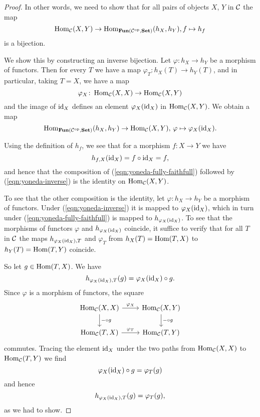 \begin{proof}
In other words, we need to show that for all pairs of objects $X$, $Y$ in ${\mathcal{C}}$ the map
\begin{equation}\label{eqn:yoneda-fully-faithfull}
	\operatorname{Hom}_{\mathcal{C}}(X,Y) \to \operatorname{Hom}_{\mathbf{Fun}({\mathcal{C}}^{\mathrm{op}},\mathbf{Set})}(h_X,h_Y), f \mapsto h_f
\end{equation}
is a bijection. 

We show this by constructing an inverse bijection. Let $\varphi\colon h_X\to h_Y$ be a morphism of functors. Then for every $T$ we have a map $\varphi_T\colon h_X(T) \to h_Y(T)$, and in particular, taking $T=X$, we have a map
\[
	\varphi_X \colon \operatorname{Hom}_{\mathcal{C}}(X,X) \to \operatorname{Hom}_{\mathcal{C}}(X,Y)
\]
and the image of ${\rm id}_X$ defines an element $\varphi_X({\rm id}_X)$ in $\operatorname{Hom}_{\mathcal{C}}(X,Y)$. We obtain a map
\begin{equation}\label{eqn:yoneda-inverse}
	\operatorname{Hom}_{\mathbf{Fun}({\mathcal{C}}^{\mathrm{op}},\mathbf{Set})}(h_X,h_Y) \to \operatorname{Hom}_{\mathcal{C}}(X,Y),\, \varphi \mapsto \varphi_X({\rm id}_X).
\end{equation}

Using the definition of $h_f$, we see that for a morphism $f\colon X\to Y$ we have
\[
	h_{f,X}({\rm id}_X) = f \circ {\rm id}_X = f,
\]
and hence that the composition of (\ref{eqn:yoneda-fully-faithfull}) followed by (\ref{eqn:yoneda-inverse}) is the
identity on $\operatorname{Hom}_{\mathcal{C}}(X,Y)$.

To see that the other composition is the identity, let $\varphi\colon h_X\to h_Y$ be a morphism of functors. Under (\ref{eqn:yoneda-inverse})
it is mapped to $\varphi_X({\rm id}_X)$, which in turn under (\ref{eqn:yoneda-fully-faithfull}) is mapped to $h_{\varphi_X({\rm id}_X)}$. To see that the morphisms of functors $\varphi$ and $h_{\varphi_X({\rm id}_X)}$ coincide, it suffice to verify that for all $T$ in ${\mathcal{C}}$ 
the maps $h_{\varphi_X({\rm id}_X),T}$ and $\varphi_T$ from $h_X(T)=\operatorname{Hom}(T,X)$ to $h_Y(T)=\operatorname{Hom}(T,Y)$ coincide.

So let $g\in \operatorname{Hom}(T,X)$. We have
\[
	h_{\varphi_X({\rm id}_X),T}(g) = \varphi_X({\rm id}_X) \circ g. 
\]
Since $\varphi$ is a morphism of functors, the square
\[
\begin{tikzcd}
\Hom_\cC(X,X) \arrow{r}{\varphi_X} \arrow{d}{-\circ g} & \Hom_\cC(X,Y) \arrow{d}{-\circ g} \\
\Hom_\cC(T,X) \arrow{r}{\varphi_T} & \Hom_\cC(T,Y)
\end{tikzcd}
\]
commutes. Tracing the element ${\rm id}_X$ under the two paths from $\operatorname{Hom}_{\mathcal{C}}(X,X)$ to $\operatorname{Hom}_{\mathcal{C}}(T,Y)$ we find
\[
	\varphi_X({\rm id}_X) \circ g = \varphi_T(g)
\]
and hence
\[
	h_{\varphi_X({\rm id}_X),T}(g) = \varphi_T(g),
\]
as we had to show.
\end{proof}

